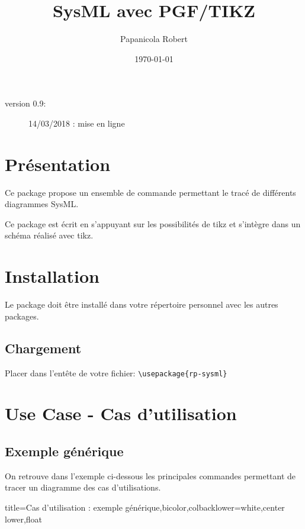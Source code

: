 \documentclass[a4paper,11pt]{article}                      %
\title{SysML  avec  PGF/TIKZ}                                    %
\author{Papanicola Robert}                                   %
\date{\today}                                     %
\begin{document}
\maketitle

\begin{description}
\item[version 0.9:] 14/03/2018 : mise en ligne

\end{description}

\section{Présentation}

Ce package propose un ensemble de commande permettant le tracé de différents diagrammes SysML.

Ce package est écrit en s'appuyant sur les possibilités de tikz et s'intègre dans un  schéma réalisé avec tikz. 

\section{Installation}

Le package doit être installé dans votre répertoire personnel avec les autres packages.

\subsection{Chargement}

Placer dans l'entête de votre fichier: 
\verb!\usepackage{rp-sysml}!


\section{Use Case - Cas d'utilisation}


\subsection{Exemple générique}

On retrouve dans l'exemple ci-dessous les principales commandes permettant de tracer  un diagramme des cas d'utilisations.

\begin{tcblisting}{title={Cas d'utilisation : exemple générique},bicolor,colbacklower=white,center lower,float}
\end{tcblisting}
\end{document}

